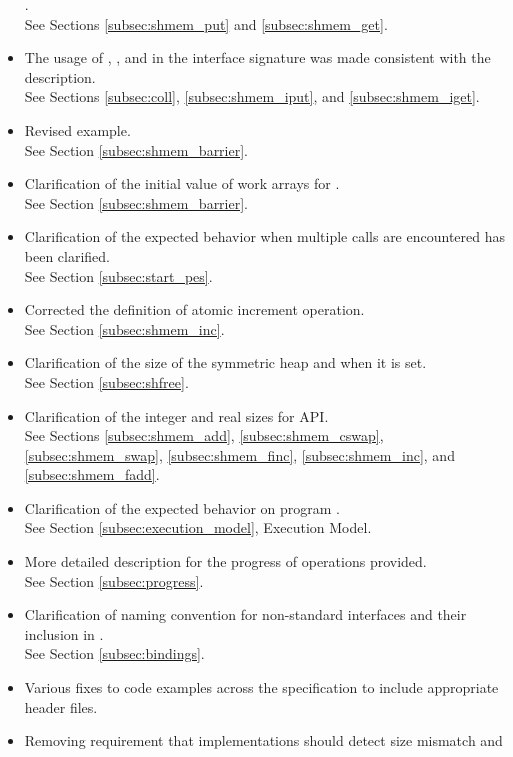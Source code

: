 \begin{itemize}
      .
\\See Sections \ref{subsec:shmem_put} and \ref{subsec:shmem_get}. 
%
\item The usage of , , and  in the
      interface signature was made consistent with the description.
\\See Sections \ref{subsec:coll}, \ref{subsec:shmem_iput}, and \ref{subsec:shmem_iget}.
%
\item Revised  example.
\\See Section \ref{subsec:shmem_barrier}. 
%
\item Clarification of the initial value of  work arrays for
.\\ See Section \ref{subsec:shmem_barrier}. 
%
\item Clarification of the expected behavior when multiple 
calls are encountered has been clarified.
\\See Section \ref{subsec:start_pes}.
%
\item Corrected the definition of atomic increment operation.
\\See Section \ref{subsec:shmem_inc}. 
%
\item Clarification of the size of the symmetric heap and when it is set.
\\See Section \ref{subsec:shfree}.
%
\item Clarification of the integer and real sizes for \Fortran{} \ac{API}.
\\See Sections \ref{subsec:shmem_add}, \ref{subsec:shmem_cswap},
      \ref{subsec:shmem_swap}, \ref{subsec:shmem_finc}, \ref{subsec:shmem_inc}, and
      \ref{subsec:shmem_fadd}. 
%
\item Clarification of the expected behavior on program .
\\See Section \ref{subsec:execution_model}, Execution Model. 
%
\item More detailed description for the progress of \openshmem operations
provided.
\\See Section \ref{subsec:progress}. 
%
\item Clarification of naming convention for non-standard interfaces and their
inclusion in .
\\See Section \ref{subsec:bindings}. 
%
\item Various fixes to \openshmem code examples across the specification to
include appropriate header files. 
%
\item Removing requirement that implementations should detect size mismatch and

\end{itemize}
